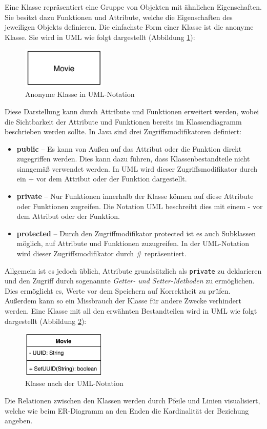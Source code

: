 		Eine Klasse repräsentiert eine Gruppe von Objekten mit ähnlichen Eigenschaften. Sie besitzt dazu Funktionen und Attribute, welche die Eigenschaften des jeweiligen Objekts definieren. Die einfachste Form einer Klasse ist die anonyme Klasse. Sie wird in UML wie folgt dargestellt (Abbildung \ref{fig:uml_anonym_class}):
		\begin{figure}[H]
			\centering 
			\includegraphics[width=4cm]{img/uml_anonym_class.JPG}
			\captionsetup{format=hang}
			\caption[Anonyme Klasse in UML-Notation]{\label{fig:uml_anonym_class}Anonyme Klasse in UML-Notation}
		\end{figure}
		Diese Darstellung kann durch Attribute und Funktionen erweitert werden, wobei die Sichtbarkeit der Attribute und Funktionen bereits im Klassendiagramm beschrieben werden sollte. In Java sind drei Zugriffsmodifikatoren definiert:
		\begin{itemize}
			\item\textbf{public} -- Es kann von Außen auf das Attribut oder die Funktion direkt zugegriffen werden. Dies kann dazu führen, dass Klassenbestandteile nicht sinngemäß verwendet werden. In UML wird dieser Zugriffsmodifikator durch ein + vor dem Attribut oder der Funktion dargestellt. 
			\item\textbf{private} -- Nur Funktionen innerhalb der Klasse können auf diese Attribute oder Funktionen zugreifen. Die Notation UML beschreibt dies mit einem - vor dem Attribut oder der Funktion.
			\item\textbf{protected} -- Durch den Zugriffmodifikator protected ist es auch Subklassen möglich, auf Attribute und Funktionen zuzugreifen. In der UML-Notation wird dieser Zugriffsmodifikator durch \# repräsentiert.
		\end{itemize}
		Allgemein ist es jedoch üblich, Attribute grundsätzlich als \texttt{private} zu deklarieren und den Zugriff durch sogenannte \textit{Getter- und Setter-Methoden} zu ermöglichen. Dies ermöglicht es, Werte vor dem Speichern auf Korrektheit zu prüfen. Außerdem kann so ein Missbrauch der Klasse für andere Zwecke verhindert werden. Eine Klasse mit all den erwähnten Bestandteilen wird in UML wie folgt dargestellt (Abbildung \ref{fig:KlasseUML}): 
		\begin{figure}[H]
			\centering 
			\includegraphics[width=4cm]{img/uml_class.JPG}
			\captionsetup{format=hang}
			\caption[Klasse in UML-Notation]{\label{fig:KlasseUML}Klasse nach der UML-Notation}
		\end{figure}
		Die Relationen zwischen den Klassen werden durch Pfeile und Linien visualisiert, welche wie beim ER-Diagramm an den Enden die Kardinalität der Beziehung angeben. 
		
